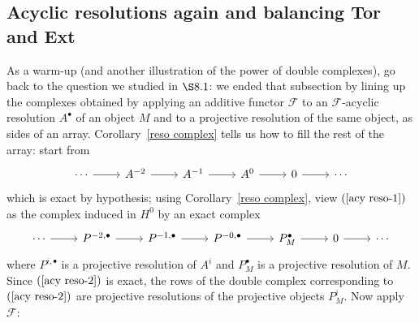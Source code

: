 \subsection{Acyclic resolutions again and balancing Tor and Ext}
As a warm-up (and another illustration of the power of double complexes), go back to the question we studied in $\S8.1$: we ended that subsection by lining up the complexes obtained by applying an additive functor $\mathscr{F}$ to an $\mathscr{F}$-acyclic resolution $A^\bullet$ of an object $M$ and to a projective resolution of the same object, as sides of an array. Corollary~\ref{reso complex} tells us how to fill the rest of the array: start from
\begin{equation}\label{acy reso-1}
\begin{tikzcd}
\cdots\ar[r]&A^{-2}\ar[r]&A^{-1}\ar[r]&A^0\ar[r]&0\ar[r]&\cdots
\end{tikzcd}
\end{equation}
which is exact by hypothesis; using Corollary~\ref{reso complex}, view $(\ref{acy reso-1})$ as the complex induced in $H^0$ by an exact complex
\begin{equation}\label{acy reso-2}
\begin{tikzcd}
\cdots\ar[r]&P^{-2,\bullet}\ar[r]&P^{-1,\bullet}\ar[r]&P^{-0,\bullet}\ar[r]&P^{\bullet}_M\ar[r]&0\ar[r]&\cdots
\end{tikzcd}
\end{equation}
where $P^{i,\bullet}$ is a projective resolution of $A^i$ and $P^\bullet_M$ is a projective resolution of $M$. Since $(\ref{acy reso-2})$ is exact, the rows of the double complex corresponding to $(\ref{acy reso-2})$ are projective resolutions of the projective objects $P^i_M$. Now apply $\mathscr{F}$:
